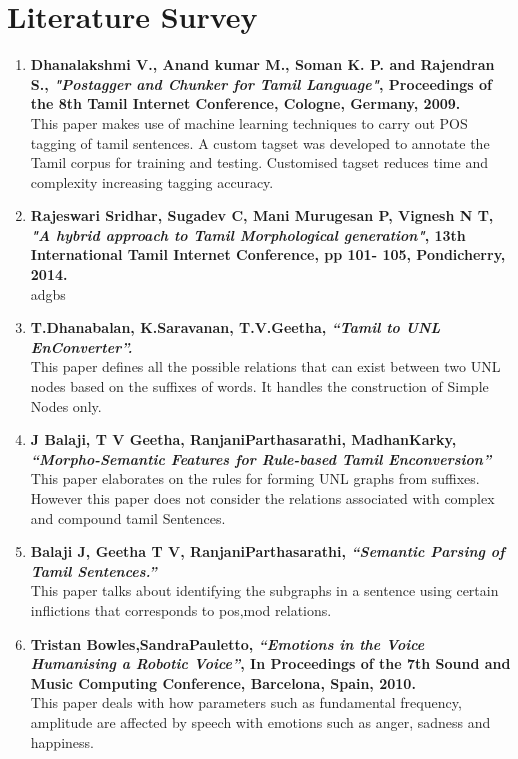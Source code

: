 \documentclass{article}
\begin{document}
\section{Literature Survey}\large
\begin{enumerate}
\item \textbf{Dhanalakshmi V., Anand kumar M., Soman K. P. and Rajendran S., \textit{"Postagger and Chunker for Tamil Language"}, Proceedings of the 8th Tamil Internet Conference, Cologne, Germany, 2009.}
\\This paper makes use of machine learning techniques to carry out POS tagging of tamil sentences. A custom tagset was developed to annotate the Tamil corpus for training and testing. Customised tagset reduces time and complexity increasing tagging accuracy.

\item \textbf{Rajeswari Sridhar, Sugadev C, Mani Murugesan P, Vignesh N T,  \textit{"A hybrid approach to Tamil Morphological generation"}, 13th International Tamil Internet Conference, pp 101- 105, Pondicherry, 2014.}
\\adgbs

\item \textbf{T.Dhanabalan, K.Saravanan, T.V.Geetha,\textit{ “Tamil to UNL EnConverter”.}}
\\This paper defines all the possible relations that can exist between two UNL nodes based on the suffixes of words. It handles the construction of Simple Nodes only.

\item \textbf{J Balaji, T V Geetha, RanjaniParthasarathi,  MadhanKarky, \textit{“Morpho-Semantic Features for Rule-based Tamil Enconversion”}} 
\\This paper elaborates on the rules for forming UNL graphs from suffixes. However this paper does not consider the relations associated with complex and compound tamil Sentences.

\item \textbf{Balaji J, Geetha T V, RanjaniParthasarathi, \textit{“Semantic Parsing of Tamil Sentences.”}}
\\This paper talks about identifying the subgraphs in a sentence using certain inflictions that corresponds to pos,mod relations.

\item  \textbf{Tristan Bowles,SandraPauletto,  \textit{“Emotions in the Voice Humanising a Robotic Voice”}, In Proceedings of the 7th Sound and Music Computing Conference, Barcelona, Spain, 2010.}
\\This paper deals with how parameters such as fundamental frequency, amplitude are affected by speech with emotions such as anger, sadness and happiness.



\end{enumerate}
\end{document}
